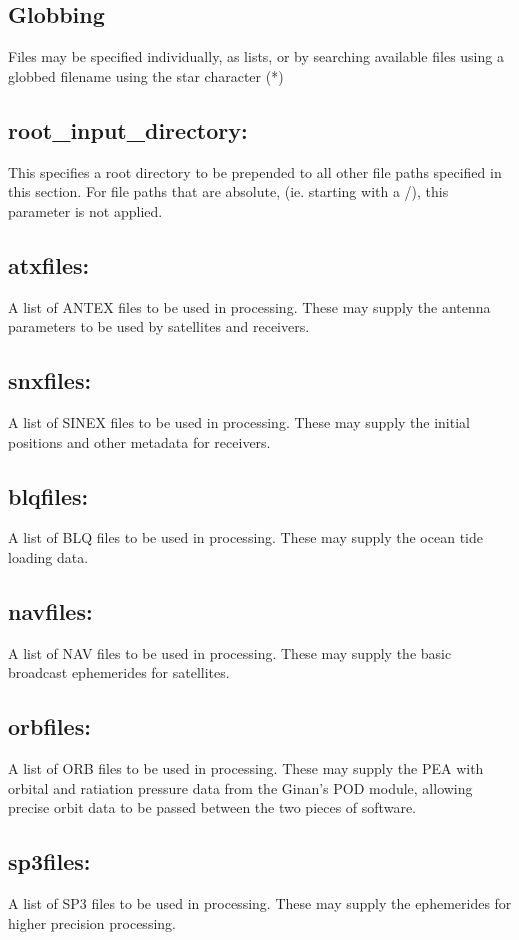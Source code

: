 \subsection{Globbing}
Files may be specified individually, as lists, or by searching available files using a globbed filename using the star character (*)

\subsection{root\_input\_directory:}
This specifies a root directory to be prepended to all other file paths specified in this section. For file paths that are absolute, (ie. starting with a /), this parameter is not applied.

\subsection{atxfiles:}
A list of ANTEX files to be used in processing. These may supply the antenna parameters to be used by satellites and receivers.

\subsection{snxfiles:}
A list of SINEX files to be used in processing. These may supply the initial positions and other metadata for receivers.

\subsection{blqfiles:}
A list of BLQ files to be used in processing. These may supply the ocean tide loading data.

\subsection{navfiles:}
A list of NAV files to be used in processing. These may supply the basic broadcast ephemerides for satellites.

\subsection{orbfiles:}
A list of ORB files to be used in processing. These may supply the PEA with orbital and ratiation pressure data from the Ginan's POD module, allowing precise orbit data to be passed between the two pieces of software.

\subsection{sp3files:}
A list of SP3 files to be used in processing. These may supply the ephemerides for higher precision processing.

